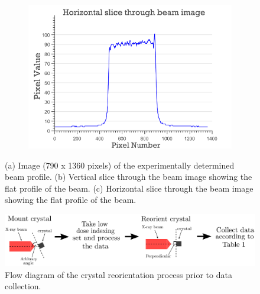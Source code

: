 \begin{figure}
    \ContinuedFloat
    \begin{subfigure}[b]{1.0\textwidth}
        \centering
        \includegraphics[width=\textwidth]{figures/dwd/beamslice_horizontal.pdf}
        \caption{}
        \label{fig:Hamburg beamslice horizontal}
    \end{subfigure}
    \caption[Beam profile at beamline P14, PETRA III, Hamburg.]{(a) Image (790 x 1360 pixels) of the experimentally determined beam profile.
    (b) Vertical slice through the beam image showing the flat profile of the beam.
    (c) Horizontal slice through the beam image showing the flat profile of the beam.}
    \label{fig: Hamburg beam pgm and slice}
\end{figure}

\begin{figure}
  \centering
    \includegraphics[width=1\textwidth]{figures/dwd/initial_indexing.pdf}
    \caption[Flow diagram of the crystal reorientation process prior to data collection at PETRA III.]{Flow diagram of the crystal reorientation process prior to data collection.}
    \label{fig: indexing flow diagram}
\end{figure}

